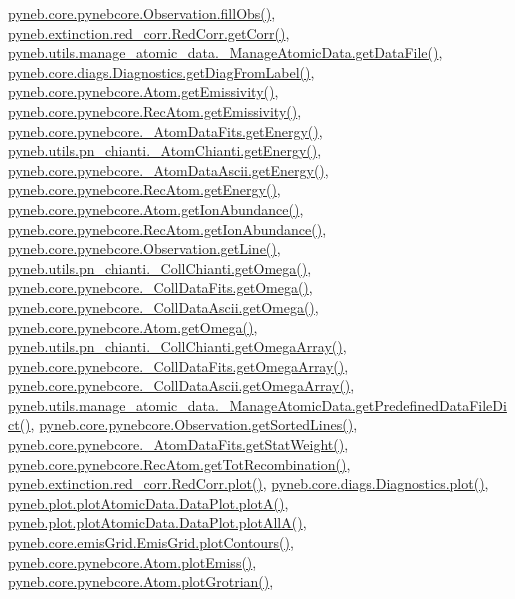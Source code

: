 \hyperlink{pynebcore_8py_source_l03574}{pyneb.\-core.\-pynebcore.\-Observation.\-fill\-Obs()}, \hyperlink{red__corr_8py_source_l00211}{pyneb.\-extinction.\-red\-\_\-corr.\-Red\-Corr.\-get\-Corr()}, \hyperlink{manage__atomic__data_8py_source_l00297}{pyneb.\-utils.\-manage\-\_\-atomic\-\_\-data.\-\_\-\-Manage\-Atomic\-Data.\-get\-Data\-File()}, \hyperlink{diags_8py_source_l00183}{pyneb.\-core.\-diags.\-Diagnostics.\-get\-Diag\-From\-Label()}, \hyperlink{pynebcore_8py_source_l01782}{pyneb.\-core.\-pynebcore.\-Atom.\-get\-Emissivity()}, \hyperlink{pynebcore_8py_source_l02990}{pyneb.\-core.\-pynebcore.\-Rec\-Atom.\-get\-Emissivity()}, \hyperlink{pynebcore_8py_source_l00275}{pyneb.\-core.\-pynebcore.\-\_\-\-Atom\-Data\-Fits.\-get\-Energy()}, \hyperlink{pn__chianti_8py_source_l00366}{pyneb.\-utils.\-pn\-\_\-chianti.\-\_\-\-Atom\-Chianti.\-get\-Energy()}, \hyperlink{pynebcore_8py_source_l00537}{pyneb.\-core.\-pynebcore.\-\_\-\-Atom\-Data\-Ascii.\-get\-Energy()}, \hyperlink{pynebcore_8py_source_l02927}{pyneb.\-core.\-pynebcore.\-Rec\-Atom.\-get\-Energy()}, \hyperlink{pynebcore_8py_source_l02176}{pyneb.\-core.\-pynebcore.\-Atom.\-get\-Ion\-Abundance()}, \hyperlink{pynebcore_8py_source_l03083}{pyneb.\-core.\-pynebcore.\-Rec\-Atom.\-get\-Ion\-Abundance()}, \hyperlink{pynebcore_8py_source_l03665}{pyneb.\-core.\-pynebcore.\-Observation.\-get\-Line()}, \hyperlink{pn__chianti_8py_source_l00507}{pyneb.\-utils.\-pn\-\_\-chianti.\-\_\-\-Coll\-Chianti.\-get\-Omega()}, \hyperlink{pynebcore_8py_source_l00828}{pyneb.\-core.\-pynebcore.\-\_\-\-Coll\-Data\-Fits.\-get\-Omega()}, \hyperlink{pynebcore_8py_source_l01082}{pyneb.\-core.\-pynebcore.\-\_\-\-Coll\-Data\-Ascii.\-get\-Omega()}, \hyperlink{pynebcore_8py_source_l01324}{pyneb.\-core.\-pynebcore.\-Atom.\-get\-Omega()}, \hyperlink{pn__chianti_8py_source_l00484}{pyneb.\-utils.\-pn\-\_\-chianti.\-\_\-\-Coll\-Chianti.\-get\-Omega\-Array()}, \hyperlink{pynebcore_8py_source_l00800}{pyneb.\-core.\-pynebcore.\-\_\-\-Coll\-Data\-Fits.\-get\-Omega\-Array()}, \hyperlink{pynebcore_8py_source_l01058}{pyneb.\-core.\-pynebcore.\-\_\-\-Coll\-Data\-Ascii.\-get\-Omega\-Array()}, \hyperlink{manage__atomic__data_8py_source_l00034}{pyneb.\-utils.\-manage\-\_\-atomic\-\_\-data.\-\_\-\-Manage\-Atomic\-Data.\-get\-Predefined\-Data\-File\-Dict()}, \hyperlink{pynebcore_8py_source_l03684}{pyneb.\-core.\-pynebcore.\-Observation.\-get\-Sorted\-Lines()}, \hyperlink{pynebcore_8py_source_l00249}{pyneb.\-core.\-pynebcore.\-\_\-\-Atom\-Data\-Fits.\-get\-Stat\-Weight()}, \hyperlink{pynebcore_8py_source_l02851}{pyneb.\-core.\-pynebcore.\-Rec\-Atom.\-get\-Tot\-Recombination()}, \hyperlink{red__corr_8py_source_l00303}{pyneb.\-extinction.\-red\-\_\-corr.\-Red\-Corr.\-plot()}, \hyperlink{diags_8py_source_l00421}{pyneb.\-core.\-diags.\-Diagnostics.\-plot()}, \hyperlink{plot_atomic_data_8py_source_l00117}{pyneb.\-plot.\-plot\-Atomic\-Data.\-Data\-Plot.\-plot\-A()}, \hyperlink{plot_atomic_data_8py_source_l00189}{pyneb.\-plot.\-plot\-Atomic\-Data.\-Data\-Plot.\-plot\-All\-A()}, \hyperlink{emis_grid_8py_source_l00182}{pyneb.\-core.\-emis\-Grid.\-Emis\-Grid.\-plot\-Contours()}, \hyperlink{pynebcore_8py_source_l02384}{pyneb.\-core.\-pynebcore.\-Atom.\-plot\-Emiss()}, \hyperlink{pynebcore_8py_source_l02443}{pyneb.\-core.\-pynebcore.\-Atom.\-plot\-Grotrian()}, 